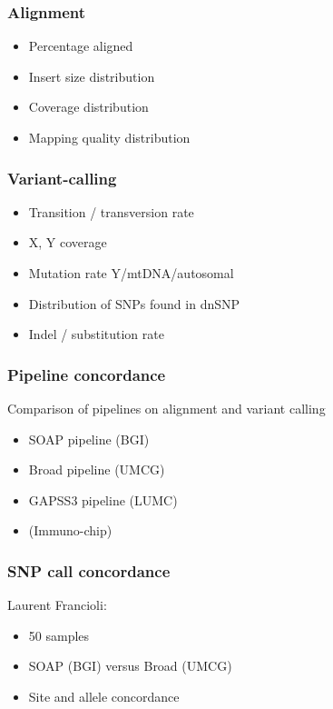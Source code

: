 \documentclass[slidestop,14pt]{beamer}
\begin{document}
\begin{frame}
  \frametitle{Alignment}

  \vspace{\baselineskip}

  \begin{itemize}
    \item Percentage aligned
    \item Insert size distribution
    \item Coverage distribution
    \item Mapping quality distribution
  \end{itemize}
\end{frame}

\begin{frame}
  \frametitle{Variant-calling}

  \vspace{\baselineskip}

  \begin{itemize}
    \item Transition / transversion rate
    \item X, Y coverage
    \item Mutation rate Y/mtDNA/autosomal
    \item Distribution of SNPs found in dnSNP
    \item Indel / substitution rate
  \end{itemize}
\end{frame}

\begin{frame}
  \frametitle{Pipeline concordance}

  \vspace{\baselineskip}

  Comparison of pipelines on alignment and variant calling

  \vspace{\baselineskip}

  \begin{itemize}
    \item SOAP pipeline (BGI)
    \item Broad pipeline (UMCG)
    \item GAPSS3 pipeline (LUMC)
    \item (Immuno-chip)
  \end{itemize}
\end{frame}

\begin{frame}
  \frametitle{SNP call concordance}

  \vspace{\baselineskip}

  Laurent Francioli:
  \begin{itemize}
    \item 50 samples
    \item SOAP (BGI) versus Broad (UMCG)
    \item Site and allele concordance
  \end{itemize}
\end{frame}
\end{document}
